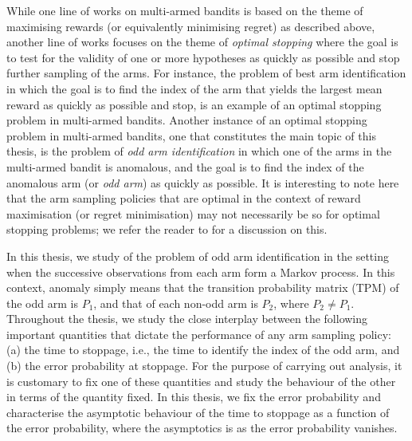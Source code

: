 
While one line of works on multi-armed bandits is based on the theme of maximising rewards (or equivalently minimising regret) as described above, another line of works focuses on the theme of {\em optimal stopping} where the goal is to test for the validity of one or more hypotheses as quickly as possible and stop further sampling of the arms. For instance, the problem of best arm identification \cite{kaufmann2016complexity} in which the goal is to find the index of the arm that yields the largest mean reward as quickly as possible and stop, is an example of an optimal stopping problem in multi-armed bandits. Another instance of an optimal stopping problem in multi-armed bandits, one that constitutes the main topic of this thesis, is the problem of {\em odd arm identification} in which one of the arms in the multi-armed bandit is anomalous, and the goal is to find the index of the anomalous arm (or {\em odd arm}) as quickly as possible. It is interesting to note here that the arm sampling policies that are optimal in the context of reward maximisation (or regret minimisation) may not necessarily be so for optimal stopping problems; we refer the reader to \cite{Bubeck2011} for a discussion on this. 

In this thesis, we study of the problem of odd arm identification in the setting when the successive observations from each arm form a Markov process. In this context, anomaly simply means that the transition probability matrix (TPM) of the odd arm is $P_1$, and that of each non-odd arm is $P_2$, where $P_2\neq P_1$. Throughout the thesis, we study the close interplay between the following important quantities that dictate the performance of any arm sampling policy: (a) the time to stoppage, i.e., the time to identify the index of the odd arm, and (b) the error probability at stoppage. For the purpose of carrying out analysis, it is customary to fix one of these quantities and study the behaviour of the other in terms of the quantity fixed. In this thesis, we fix the error probability and characterise the asymptotic behaviour of the time to stoppage as a function of the error probability, where the asymptotics is as the error probability vanishes. 

